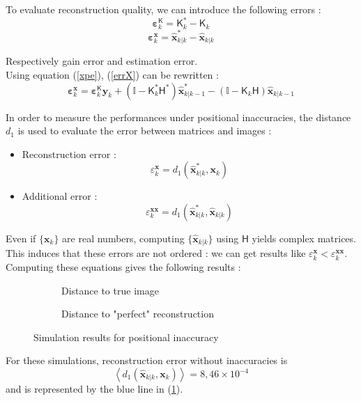 \documentclass[titlepage]{article}
\renewcommand{\H}{\boldsymbol{\mathsf{H}}}
\newcommand{\K}{\boldsymbol{\mathsf{K}}}
\newcommand{\x}{\boldsymbol{x}}
\newcommand{\y}{\boldsymbol{y}}
\newcommand{\xp}{\widehat{\x}_{k|k-1}}
\newcommand{\xe}{\widehat{\x}_{k|k}}
\newcommand{\vbeps}{\boldsymbol{\varepsilon}}
\begin{document}
	To evaluate reconstruction quality, we can introduce the following errors :
	\begin{equation}
		\vbeps^{\K}_k = \K_k^* - \K_k
	\end{equation}
	\begin{equation}\label{errX}
		\vbeps^{\x}_k = \xe^* - \xe
	\end{equation}

	Respectively gain error and estimation error.\\
	Using equation (\ref{xpe}), (\ref{errX}) can be rewritten :
	\begin{equation}
		\vbeps^{\x}_k = \vbeps^{\K}_k\y_k + \left(\mathbb{I} - \K_k^*\H^*\right)\xp^* - \left(\mathbb{I} - \K_k\H\right)\xp
	\end{equation}
	
	In order to measure the performances under positional inaccuracies, the distance $d_1$ is used to evaluate the error between matrices and images :
	\begin{itemize}
		\item Reconstruction error : 
		$$
			\varepsilon_k^{\x} = d_1\left(\xe^*,\x_k\right)
		$$
		\item Additional error : 
		$$
			\varepsilon_k^{\x\x} = d_1\left(\xe^*,\xe\right)
		$$
	\end{itemize}

	Even if $\{\x_k\}$ are real numbers, computing $\{\xe\}$ using $\H$ yields complex matrices. This induces that these errors are not ordered : we can get results like $\varepsilon_k^{\x} < \varepsilon_k^{\x\x}$. 
	Computing these equations gives the following results :
	
	
	\begin{figure}[H]
		\centering
		\begin{subfigure}{.5\textwidth}
			\centering
			
			\caption{Distance to true image}
			\label{fig:p_e_x_e}
		\end{subfigure}%
		\begin{subfigure}{.5\textwidth}
			\centering
			
			\caption{Distance to "perfect" reconstruction}
		\end{subfigure}
	\caption{Simulation results for positional inaccuracy}
	\end{figure}
	
	For these simulations, reconstruction error without inaccuracies is 
	$$ %
	\left\langle d_1\left(\xe,\x_k\right)\right\rangle = 8,46\times10^{-4}
	$$
	and is represented by the blue line in (\ref{fig:p_e_x_e}).\\
	
\end{document}
